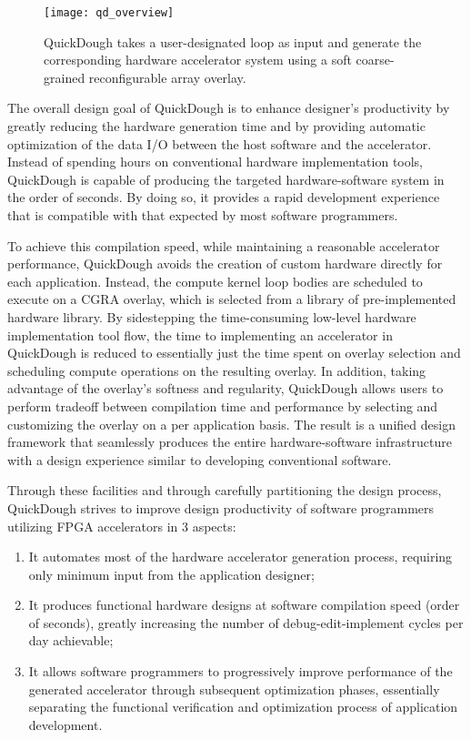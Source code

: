 \begin{figure}
\centering
\texttt{[image: qd\_overview]}
\caption{QuickDough takes a user-designated loop as input and generate the corresponding hardware accelerator system using a soft coarse-grained reconfigurable array overlay.}
\label{fig:qd_overview}
\end{figure}

The overall design goal of QuickDough is to enhance designer's productivity by greatly reducing the hardware generation time and by providing automatic optimization of the data I/O between the host software and the accelerator.
Instead of spending hours on conventional hardware implementation tools, QuickDough is capable of producing the targeted hardware-software system in the order of seconds.
By doing so, it provides a rapid development experience that is compatible with that expected by most software programmers.

To achieve this compilation speed, while maintaining a reasonable accelerator performance, QuickDough avoids the creation of custom hardware directly for each application.
Instead, the compute kernel loop bodies are scheduled to execute on a CGRA overlay, which is selected from a library of pre-implemented hardware library.
By sidestepping the time-consuming low-level hardware implementation tool flow, the time to implementing an accelerator in QuickDough is reduced to essentially just the time spent on overlay selection and scheduling compute operations on the resulting overlay.
In addition, taking advantage of the overlay's softness and regularity, QuickDough allows users to perform tradeoff between compilation time and performance by selecting and customizing the overlay on a per application basis.  The result is a unified design framework that seamlessly produces the entire hardware-software infrastructure with a design experience similar to developing conventional software.

Through these facilities and through carefully partitioning the design process, QuickDough strives to improve design productivity of software programmers utilizing FPGA accelerators in 3 aspects:

\begin{enumerate}[nosep]
\item It automates most of the hardware accelerator generation process, requiring only minimum input from the application designer;
\item It produces functional hardware designs at software compilation speed (order of seconds), greatly increasing the number of debug-edit-implement cycles per day achievable;
\item It allows software programmers to progressively improve performance of the generated accelerator through subsequent optimization phases, essentially separating the functional verification and optimization process of application development.
\end{enumerate}

